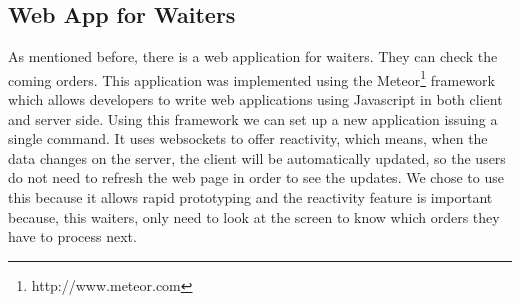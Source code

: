 \subsection{Web App for Waiters}
\label{sub:web_app_for_waiters}
As mentioned before, there is a web application for waiters. They can
check the coming orders.
This application was implemented using the
Meteor\footnote{http://www.meteor.com}\cite{meteor} framework which allows developers
to write web applications using Javascript in both client and server side.
Using this framework we can set up a new application issuing a single command.
It uses websockets\cite{websockets} to offer reactivity, which means,
when the data changes on the server,
the client will be automatically updated, so the users do not need to
refresh the web page in order to see the updates. We chose to use this
because it allows rapid prototyping and the reactivity feature is important
because, this waiters, only need to look at the screen to know which
orders they have to process next.
